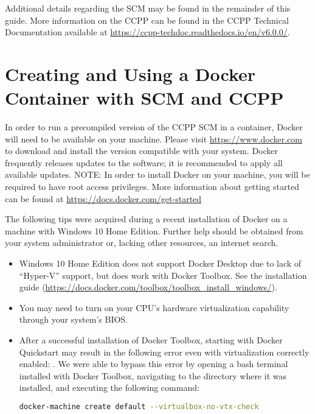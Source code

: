 Additional details regarding the SCM may be found in the remainder of this guide. More information on the CCPP can be found in the CCPP Technical Documentation available at \url{https://ccpp-techdoc.readthedocs.io/en/v6.0.0/}.

\section{Creating and Using a Docker Container with SCM and CCPP}
\label{docker}

In order to run a precompiled version of the CCPP SCM in a container, Docker will need to be available on your machine. Please visit \url{https://www.docker.com} to download and install the version compatible with your system. Docker frequently releases updates to the software; it is recommended to apply all available updates. NOTE: In order to install Docker on your machine, you will be required to have root access privileges. More information about getting started can be found at \url{https://docs.docker.com/get-started}

The following tips were acquired during a recent installation of Docker on a machine with Windows 10 Home Edition. Further help should be obtained from your system administrator or, lacking other resources, an internet search.

\begin{itemize}
\item Windows 10 Home Edition does not support Docker Desktop due to lack of ``Hyper-V'' support, but does work with Docker Toolbox. See the installation guide (\url{https://docs.docker.com/toolbox/toolbox_install_windows/}).
\item You may need to turn on your CPU's hardware virtualization capability through your system's BIOS.
\item After a successful installation of Docker Toolbox, starting with Docker Quickstart may result in the following error even with virtualization correctly enabled: . We were able to bypass this error by opening a bash terminal installed with Docker Toolbox, navigating to the directory where it was installed, and executing the following command:
\begin{lstlisting}[language=bash]
docker-machine create default --virtualbox-no-vtx-check
\end{lstlisting}
\end{itemize}

